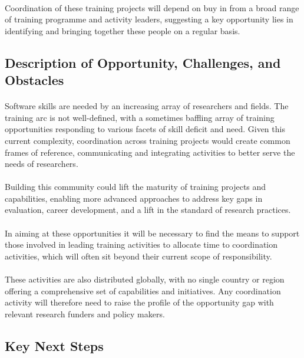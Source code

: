 \paragraph{}
Coordination of these training projects will depend on buy in from a broad range of training programme and activity leaders, suggesting a key opportunity lies in identifying and bringing together these people on a regular basis.

\subsection{Description of Opportunity, Challenges, and Obstacles}
\paragraph{}
Software skills are needed by an increasing array of researchers and fields. The training arc is not well-defined, with a sometimes baffling array of training opportunities responding to various facets of skill deficit and need. Given this current complexity, coordination across training projects would create common frames of reference, communicating and integrating activities to better serve the needs of researchers. 
\paragraph{}
Building this community could lift the maturity of training projects and capabilities, enabling more advanced approaches to address key gaps in evaluation, career development, and a lift in the standard of research practices. 
\paragraph{}
In aiming at these opportunities it will be necessary to find the means to support those involved in leading training activities to allocate time to coordination activities, which will often sit beyond their current scope of responsibility. 
\paragraph{}
These activities are also distributed globally, with no single country or region offering a comprehensive set of capabilities and initiatives. Any coordination activity will therefore need to raise the profile of the opportunity gap with relevant research funders and policy makers.

\subsection{Key Next Steps}

